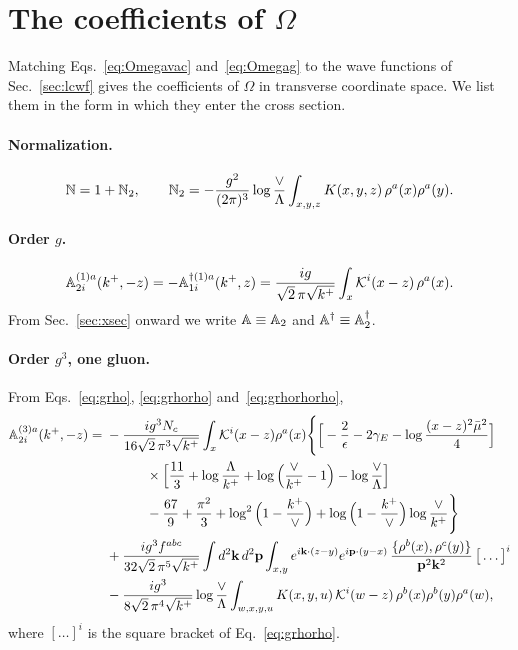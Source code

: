 \section{The coefficients of \texorpdfstring{$\Omega$}{Omega}}\label{sec:omega}

Matching Eqs.~\eqref{eq:Omegavac} and~\eqref{eq:Omegag} to the wave functions of Sec.~\ref{sec:lcwf} gives the coefficients of $\Omega$ in transverse coordinate space. We list them in the form in which they enter the cross section.

\paragraph*{Normalization.}
\begin{equation}
\mathbb{N}=1+\mathbb{N}_2,\qquad \mathbb{N}_2=-\frac{g^2}{(2\pi)^3}\log\frac{\vee}{\Lambda}\int_{x,y,z}K(x,y,z)\,\rho^a(x)\rho^a(y).
\label{eq:Ncoef}
\end{equation}

\paragraph*{Order $g$.}
\begin{equation}
\mathbb{A}^{(1)a}_{2i}(k^+,-z)=-\mathbb{A}^{\dagger(1)a}_{1i}(k^+,z)=\frac{ig}{\sqrt2\,\pi\sqrt{k^+}}\int_x\mathcal{K}^i(x-z)\,\rho^a(x).
\label{eq:A1X}
\end{equation}
From Sec.~\ref{sec:xsec} onward we write $\mathbb{A}\equiv\mathbb{A}_2$ and $\mathbb{A}^\dagger\equiv\mathbb{A}_2^\dagger$.

\paragraph*{Order $g^3$, one gluon.} From Eqs.~\eqref{eq:grho}, \eqref{eq:grhorho} and~\eqref{eq:grhorhorho},
\begin{align}
\mathbb{A}^{(3)a}_{2i}(k^+,-z)={}&-\frac{ig^3N_c}{16\sqrt2\,\pi^3\sqrt{k^+}}\int_x\mathcal{K}^i(x-z)\rho^a(x)\Bigg\{\Big[-\frac2\epsilon-2\gamma_E-\log\frac{(x-z)^2\bar\mu^2}{4}\Big]\notag\\
&\hspace{3em}\times\Big[\frac{11}{3}+\log\frac{\Lambda}{k^+}+\log\Big(\frac{\vee}{k^+}-1\Big)-\log\frac{\vee}{\Lambda}\Big]\notag\\
&\hspace{3em}-\frac{67}{9}+\frac{\pi^2}{3}+\log^2\Big(1-\frac{k^+}{\vee}\Big)+\log\Big(1-\frac{k^+}{\vee}\Big)\log\frac{\vee}{k^+}\Bigg\}\notag\\
&+\frac{ig^3f^{abc}}{32\sqrt2\,\pi^5\sqrt{k^+}}\int d^2\mathbf k\,d^2\mathbf p\int_{x,y}e^{i\mathbf k\cdot(z-y)}e^{i\mathbf p\cdot(y-x)}\,\frac{\{\rho^b(x),\rho^c(y)\}}{\mathbf p^2\mathbf k^2}\,\big[\dots\big]^i\notag\\
&-\frac{ig^3}{8\sqrt2\,\pi^4\sqrt{k^+}}\log\frac{\vee}{\Lambda}\int_{w,x,y,u}K(x,y,u)\,\mathcal{K}^i(w-z)\,\rho^b(x)\rho^b(y)\rho^a(w),
\label{eq:A3X}
\end{align}
where $[\dots]^i$ is the square bracket of Eq.~\eqref{eq:grhorho}.

